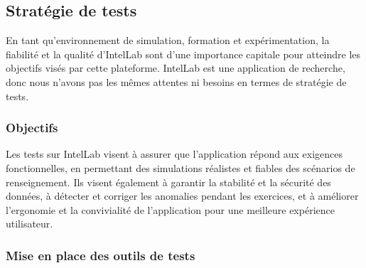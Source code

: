 \subsection{Stratégie de tests}

En tant qu'environnement de simulation, formation et expérimentation, la fiabilité et la qualité d’IntelLab sont d'une importance capitale pour atteindre les objectifs visés par cette plateforme.
IntelLab est une application de recherche, donc nous n’avons pas les mêmes attentes ni besoins en termes de stratégie de tests.


\subsubsection{Objectifs}
Les tests sur IntelLab visent à assurer que l'application répond aux exigences fonctionnelles, en permettant des simulations réalistes et fiables des scénarios de renseignement.
Ils visent également à garantir la stabilité et la sécurité des données, à détecter et corriger les anomalies pendant les exercices, et à améliorer l'ergonomie et la convivialité de l'application pour une meilleure expérience utilisateur.


\subsubsection{Mise en place des outils de tests}

